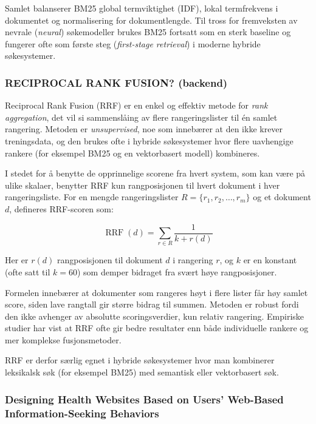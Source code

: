 Samlet balanserer BM25 global termviktighet (IDF), lokal termfrekvens i dokumentet og normalisering for dokumentlengde. Til tross for fremveksten av nevrale (\textit{neural}) søkemodeller brukes BM25 fortsatt som en sterk baseline og fungerer ofte som første steg (\textit{first-stage retrieval}) i moderne hybride søkesystemer.
\cite{robertson2009bm25}

\subsubsection{ RECIPROCAL RANK FUSION? (backend)}
\label{sec:rrf-teori}

Reciprocal Rank Fusion (RRF) er en enkel og effektiv metode for \textit{rank aggregation}, det vil si sammenslåing av flere rangeringslister til én samlet rangering. Metoden er \textit{unsupervised}, noe som innebærer at den ikke krever treningsdata, og den brukes ofte i hybride søkesystemer hvor flere uavhengige rankere (for eksempel BM25 og en vektorbasert modell) kombineres.

I stedet for å benytte de opprinnelige scorene fra hvert system, som kan være på ulike skalaer, benytter RRF kun rangposisjonen til hvert dokument i hver rangeringsliste. For en mengde rangeringslister $R = \{r_1, r_2, \dots, r_m\}$ og et dokument $d$, defineres RRF-scoren som:

\begin{equation}
\operatorname{RRF}(d) = \sum_{r \in R} \frac{1}{k + r(d)}
\end{equation}

Her er $r(d)$ rangposisjonen til dokument $d$ i rangering $r$, og $k$ er en konstant (ofte satt til $k=60$) som demper bidraget fra svært høye rangposisjoner.

Formelen innebærer at dokumenter som rangeres høyt i flere lister får høy samlet score, siden lave rangtall gir større bidrag til summen. Metoden er robust fordi den ikke avhenger av absolutte scoringsverdier, kun relativ rangering. Empiriske studier har vist at RRF ofte gir bedre resultater enn både individuelle rankere og mer komplekse fusjonsmetoder.

RRF er derfor særlig egnet i hybride søkesystemer hvor man kombinerer leksikalsk søk (for eksempel BM25) med semantisk eller vektorbasert søk.

\subsubsection{Designing Health Websites Based on Users’ Web-Based Information-Seeking Behaviors}

